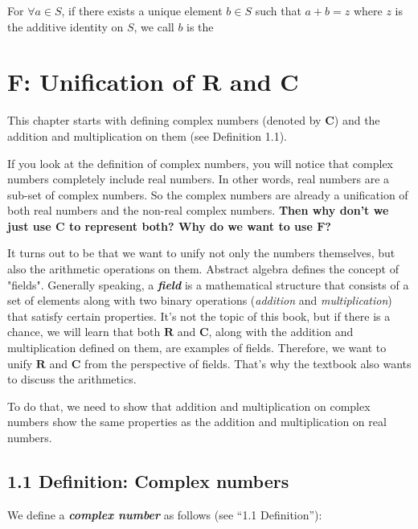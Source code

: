 \documentclass[12pt, letterpaper, oneside]{book}
\begin{document}
For $\forall a \in S$, if there exists a unique element $b \in S$ such that
$a + b = z$ where $z$ is the additive identity on $S$, we call $b$ is the

\section{$\mathbf{F}$: Unification of $\mathbf{R}$ and $\mathbf{C}$}

This chapter starts with defining complex numbers (denoted by $\mathbf{C}$) and
the addition and multiplication on them (see Definition 1.1).

If you look at the definition of complex numbers, you will notice that complex
numbers completely include real numbers. In other words, real numbers are a
sub-set of complex numbers. So the complex numbers are already a unification of
both real numbers and the non-real complex numbers. \textbf{Then why don't we
just use $\mathbf{C}$ to represent both? Why do we want to use $\mathbf{F}$?}

It turns out to be that we want to unify not only the numbers themselves, but
also the arithmetic operations on them. Abstract algebra defines the concept of
"fields". Generally speaking, a \textbf{\textit{field}} is a mathematical
structure that consists of a set of elements along with two binary operations
(\textit{addition} and \textit{multiplication}) that satisfy certain properties.
It's not the topic of this book, but if there is a chance, we will learn that
both $\mathbf{R}$ and $\mathbf{C}$, along with the addition and multiplication
defined on them, are examples of fields. Therefore, we want to unify
$\mathbf{R}$ and $\mathbf{C}$ from the perspective of fields. That's why the
textbook also wants to discuss the arithmetics.

To do that, we need to show that addition and multiplication on complex numbers
show the same properties as the addition and multiplication on real numbers.

\subsection{1.1 Definition: Complex numbers}

We {define} a \textbf{\emph{complex number}} as follows (see
``1.1 Definition''):
\end{document}
